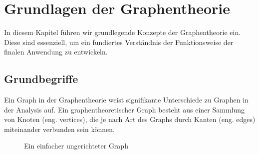 \section{Grundlagen der Graphentheorie}
In diesem Kapitel führen wir grundlegende Konzepte der Graphentheorie ein. Diese sind essenziell, um ein fundiertes Verständnis der Funktionsweise der finalen Anwendung zu entwickeln.

\subsection{Grundbegriffe}
Ein Graph in der Graphentheorie weist signifikante Unterschiede zu Graphen in der Analysis auf. Ein graphentheoretischer Graph besteht aus einer Sammlung von Knoten (eng. vertices), die je nach Art des Graphs durch Kanten (eng. edges) miteinander verbunden sein können.
\begin{figure}[h]
    \centering
    
    \caption{Ein einfacher ungerichteter Graph}
\end{figure}
